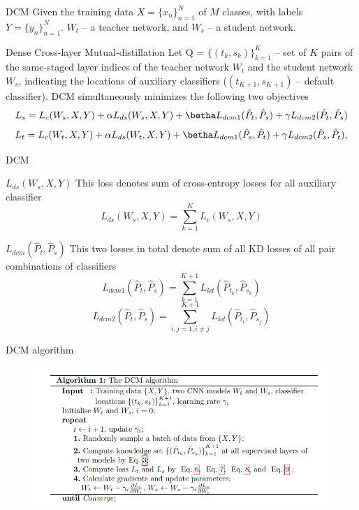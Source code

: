 \documentclass{beamer}
\begin{document}
\begin{frame}{DCM}
Given the training data $X = \{x_n\}^N_{n=1}$ of $M$ classes, with labels $Y = \{y_n\}^N_{n=1}$. $W_t$ -- a teacher network, and  $W_s$ -- a student network.\par
    \begin{block}{Dense Cross-layer Mutual-distillation}
        Let Q = $\{(t_k, s_k)\}^K_{k=1}$ -- set of $K$ pairs of the same-staged layer indices of the teacher network $W_t$ and the student network $W_s$, indicating the locations of auxiliary classifiers ($(t_{K+1}, s_{K+1})$ -- default classifier). DCM simultaneously minimizes the following two objectives
        $$L_s = L_c(W_s, X, Y) + \alpha L_{ds}(W_s, X, Y ) + \betha L_{dcm1} (\hat P_t, \hat P_s) + \gamma L_{dcm2} (\hat P_t, \hat P_s)$$
        $$L_t = L_c(W_t, X, Y) + \alpha L_{ds}(W_t, X, Y ) + \betha L_{dcm1} (\hat P_s, \hat P_t) + \gamma L_{dcm2} (\hat P_s, \hat P_t),$$
    \end{block}

\end{frame}

\begin{frame}{DCM}
    \begin{block}{$L_{ds}(W_s, X, Y)$}
        This loss denotes sum of cross-entropy losses for all auxiliary classifier
        $$L_{ds}(W_s, X, Y) = \sum_{k=1}^{K} L_c(W_s, X, Y)$$
    \end{block}
    \begin{block}{$L_{dcm}(\hat P_t, \hat P_s)$}
        This two losses in total denote sum of all KD losses of all pair combinations of classifiers
        $$L_{dcm1}(\hat P_t, \hat P_s) = \sum_{k=1}^{K+1} L_{kd}(\hat P_{t_k}, \hat P_{s_k})$$
        $$L_{dcm2}(\hat P_t, \hat P_s) = \sum_{i,j=1; i\neq j}^{K+1} L_{kd}(\hat P_{t_i}, \hat P_{s_j})$$
    \end{block}
\end{frame}

\begin{frame}{DCM algorithm}
    \begin{figure}[h]
        \includegraphics[scale=0.45]{images/algo.png}
     \end{figure}
\end{frame}
\end{document}
